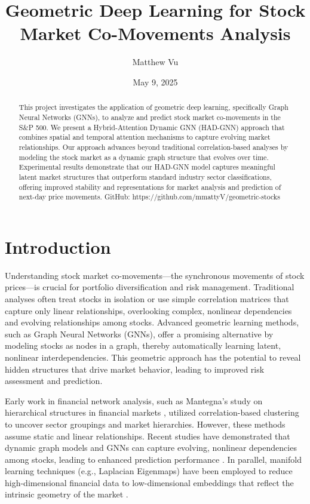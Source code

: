 \documentclass[12pt]{article}
\title{Geometric Deep Learning for Stock Market Co-Movements Analysis}
\author{Matthew Vu}
\date{May 9, 2025}
\begin{document}
\maketitle

\begin{abstract}
This project investigates the application of geometric deep learning, specifically Graph Neural Networks (GNNs), to analyze and predict stock market co-movements in the S\&P 500. We present a Hybrid-Attention Dynamic GNN (HAD-GNN) approach that combines spatial and temporal attention mechanisms to capture evolving market relationships. Our approach advances beyond traditional correlation-based analyses by modeling the stock market as a dynamic graph structure that evolves over time. Experimental results demonstrate that our HAD-GNN model captures meaningful latent market structures that outperform standard industry sector classifications, offering improved stability and representations for market analysis and prediction of next-day price movements. GitHub: https://github.com/mmattyV/geometric-stocks
\end{abstract}

\section{Introduction}

Understanding stock market co-movements—the synchronous movements of stock prices—is crucial for portfolio diversification and risk management. Traditional analyses often treat stocks in isolation or use simple correlation matrices that capture only linear relationships, overlooking complex, nonlinear dependencies and evolving relationships among stocks. Advanced geometric learning methods, such as Graph Neural Networks (GNNs), offer a promising alternative by modeling stocks as nodes in a graph, thereby automatically learning latent, nonlinear interdependencies. This geometric approach has the potential to reveal hidden structures that drive market behavior, leading to improved risk assessment and prediction.

Early work in financial network analysis, such as Mantegna's study on hierarchical structures in financial markets \cite{mantegna1999}, utilized correlation-based clustering to uncover sector groupings and market hierarchies. However, these methods assume static and linear relationships. Recent studies have demonstrated that dynamic graph models and GNNs can capture evolving, nonlinear dependencies among stocks, leading to enhanced prediction performance \cite{kipf2017}. In parallel, manifold learning techniques (e.g., Laplacian Eigenmaps) have been employed to reduce high-dimensional financial data to low-dimensional embeddings that reflect the intrinsic geometry of the market \cite{belkin2003}.
\end{document}
